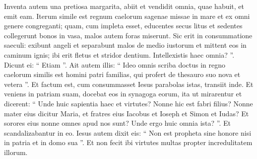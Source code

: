 \begin{biblechapter}
\begin{biblechapter}
\begin{biblechapter}
\begin{biblechapter}
\begin{biblechapter}
\begin{biblechapter}
\begin{biblechapter}
\begin{biblechapter}
\begin{biblechapter}
\begin{biblechapter}
\begin{biblechapter}
\begin{biblechapter}
\begin{biblechapter}
\verse Inventa autem una pretiosa margarita, abiit et vendidit omnia, quae habuit, et emit eam.
 \verse Iterum simile est regnum caelorum sagenae missae in mare et ex omni genere congreganti; 
\verse quam, cum impleta esset, educentes secus litus et sedentes collegerunt bonos in vasa, malos autem foras miserunt. 
\verse Sic erit in consummatione saeculi: exibunt angeli et separabunt malos de medio iustorum 
 \verse et mittent eos in caminum ignis; ibi erit fletus et stridor dentium.
 \verse Intellexistis haec omnia? ”. Dicunt ei: “ Etiam ”. 
\verse Ait autem illis: “ Ideo omnis scriba doctus in regno caelorum similis est homini patri familias, qui profert de thesauro suo nova et vetera ”.
 \verse Et factum est, cum consummasset Iesus parabolas istas, transiit inde. 
\verse Et veniens in patriam suam, docebat eos in synagoga eorum, ita ut mirarentur et dicerent: “ Unde huic sapientia haec et virtutes? 
\verse Nonne hic est fabri filius? Nonne mater eius dicitur Maria, et fratres eius Iacobus et Ioseph et Simon et Iudas? 
\verse Et sorores eius nonne omnes apud nos sunt? Unde ergo huic omnia ista? ”. 
\verse Et scandalizabantur in eo. Iesus autem dixit eis: “ Non est propheta sine honore nisi in patria et in domo sua ”. 
\verse Et non fecit ibi virtutes multas propter incredulitatem illorum.
 

\end{biblechapter}
\end{biblechapter}
\end{biblechapter}
\end{biblechapter}
\end{biblechapter}
\end{biblechapter}
\end{biblechapter}
\end{biblechapter}
\end{biblechapter}
\end{biblechapter}
\end{biblechapter}
\end{biblechapter}
\end{biblechapter}
